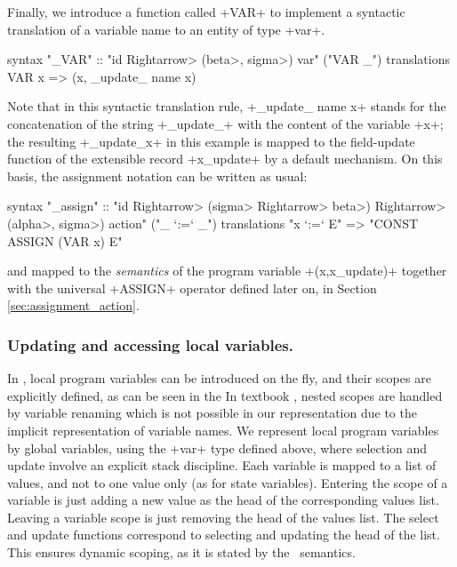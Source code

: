 \documentclass[11pt,a4paper]{article}
\begin{document}
Finally, we introduce a function called \inlineisar+VAR+ to implement a syntactic translation of a 
variable name to an entity of type \inlineisar+var+.
\begin{isar}
syntax "_VAR" :: "id \<Rightarrow> (\<beta>, \<sigma>) var"  ("VAR _")
translations VAR x => (x, _update_ name x)
\end{isar}
Note that in this syntactic translation rule, \inlineisar+_update_ name x+ stands for the 
concatenation of the string \inlineisar+_update_+ with the content of the variable  \inlineisar+x+; 
the resulting \inlineisar+_update_x+ in this example is mapped to the field-update function of the 
extensible record \inlineisar+x_update+ by a default mechanism. 
On this basis, the assignment notation can be written as usual:
\begin{isar}
syntax
  "_assign" :: "id \<Rightarrow> (\<sigma> \<Rightarrow> \<beta>) \<Rightarrow> (\<alpha>, \<sigma>) action"  ("_ `:=` _")
translations
  "x `:=` E"   => "CONST ASSIGN (VAR x) E"
\end{isar}
and mapped to the \emph{semantics} of the program variable \inlineisar+(x,x_update)+ together with 
the universal \inlineisar+ASSIGN+ operator defined later on, in Section \ref{sec:assignment_action}.
\begin{comment}
as follows:
\begin{isar}
definition
  ASSIGN::"(\<beta>, \<sigma>) var \<Rightarrow> (\<sigma> \<Rightarrow> \<beta>) \<Rightarrow> (\<alpha>::ev_eq, \<sigma>) action"
where
  ASSIGN x e \<equiv>   ...
\end{isar}
The details in this definition based on UTP and embedded into \Circus-Actions can be found in 
Section \ref{sec:assignment_action}.
\end{comment}

\subsubsection{Updating and accessing local variables.}
In \Circus , local program variables can be introduced on the fly, and their scopes are explicitly 
defined, as can be seen in the %
In textbook \Circus , nested scopes are handled by variable renaming which is not possible in our 
representation due to the implicit representation of variable names.
We represent local program variables by global variables, %
using the \inlineisar+var+ type defined above, where selection and update involve an explicit 
stack discipline. Each variable is mapped to a list of values, and not to one value only 
(as for state variables). Entering the scope of a variable 
is just adding a new value as the head of the corresponding values list. Leaving a variable scope 
is just removing the head of the values list. The select and update functions correspond to selecting 
and updating the head of the list. This ensures dynamic scoping, as it is stated by the \Circus\ 
semantics. 
\end{document}
